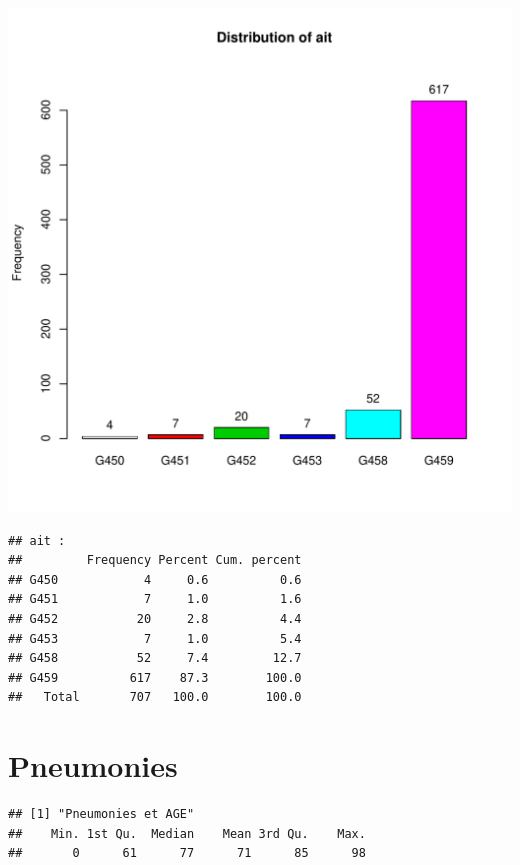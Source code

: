 \documentclass[12pt,english,french,twoside]{book}\usepackage[]{graphicx}\usepackage[]{color}
\makeatletter
\def\maxwidth{ %
  \ifdim\Gin@nat@width>\linewidth
    \linewidth
  \else
    \Gin@nat@width
  \fi
}
\newenvironment{kframe}{%
 \def\at@end@of@kframe{}%
 \ifinner\ifhmode%
  \def\at@end@of@kframe{\end{minipage}}%
  \begin{minipage}{\columnwidth}%
 \fi\fi%
 \def\FrameCommand##1{\hskip\@totalleftmargin \hskip-\fboxsep
 \colorbox{shadecolor}{##1}\hskip-\fboxsep
     \hskip-\linewidth \hskip-\@totalleftmargin \hskip\columnwidth}%
 \MakeFramed {\advance\hsize-\width
   \@totalleftmargin\z@ \linewidth\hsize
   \@setminipage}}%
 {\par\unskip\endMakeFramed%
 \at@end@of@kframe}
\newenvironment{knitrout}{}{} %
\makeatother
\begin{document}
\begin{knitrout}
\color{fgcolor}
\includegraphics[width=\maxwidth]{figure/ait} 
\begin{kframe}\begin{verbatim}
## ait :  
##         Frequency Percent Cum. percent
## G450            4     0.6          0.6
## G451            7     1.0          1.6
## G452           20     2.8          4.4
## G453            7     1.0          5.4
## G458           52     7.4         12.7
## G459          617    87.3        100.0
##   Total       707   100.0        100.0
\end{verbatim}
\end{kframe}
\end{knitrout}


\section{Pneumonies}

\begin{knitrout}
\color{fgcolor}\begin{kframe}


{\ttfamily\noindent\color{warningcolor}{\#\# Warning: impossible d'ouvrir le fichier '../mes\_fonctions.R' : Aucun fichier ou dossier de ce type}}

{\ttfamily\noindent\bfseries\color{errorcolor}{\#\# Error: impossible d'ouvrir la connexion}}\begin{verbatim}
## [1] "Pneumonies et AGE"
##    Min. 1st Qu.  Median    Mean 3rd Qu.    Max. 
##       0      61      77      71      85      98
\end{verbatim}
\end{kframe}
\end{knitrout}
\end{document}

